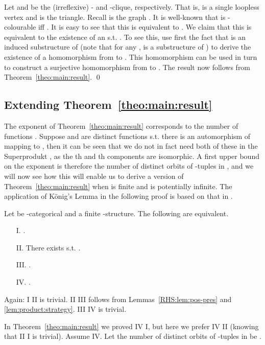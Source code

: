 \documentclass{LMCS}
\begin{document}
Let  and  be the (irreflexive) - and -clique, respectively. That is,  is a single loopless vertex and  is the triangle. 
Recall  is the graph . It is well-known that  is -colourable iff . It is easy to see that this is equivalent to . We claim that this is equivalent to the existence of an  s.t. . 
To see this, use first the fact that  is an induced substructure of  (note that for any ,  is a substructure of ) to derive the existence of a homomorphism from  to . This homomorphism can be used in turn to construct a surjective homomorphism from  to .
The result now follows from Theorem~\ref{theo:main:result}. 
\qed

\subsection{Extending Theorem~\ref{theo:main:result}}
\label{sec:omega-cat}

The exponent  of Theorem~\ref{theo:main:result} corresponds to the number of functions . Suppose  and  are distinct functions s.t. there is an automorphism of  mapping  to , then it can be seen that we do not in fact need both of these in the Superprodukt , as the th and
th components are isomorphic. A first upper bound on the
exponent is therefore the number of distinct orbits of -tuples in
, and we will now see how this will enable us to derive a
version of Theorem~\ref{theo:main:result} when  is finite
and  is potentially infinite. The application of
K\"onig's Lemma in the following proof is based on that in
\cite{BodirskyNesetrilJLC}.
\newpage
\begin{thm}\label{theo:omega-cat}
  Let  be -categorical and  a finite -structure. The following are equivalent.
  \begin{enumerate}[label=\Roman*.]
  \item[I.] .
  \item[II.] There exists  s.t. .
  \item[III.] .
  \item[IV.] .
  \end{enumerate}
\end{thm}
\proof
Again: I  II  is trivial. II  III follows from Lemmas~\ref{RHS:lem:pos-pres} and \ref{lem:product:strategy}. III  IV is trivial. 

In Theorem~\ref{theo:main:result} we proved IV  I, but here we prefer IV  II (knowing that II  I is trivial).  Assume IV.  Let the number of distinct orbits of -tuples in  be .
\end{document}
